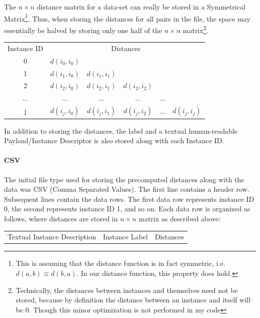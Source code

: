 \documentclass[a4paper,11pt]{report}
\begin{document}
The $n \times n$ distance matrix for a data-set can really be stored in a Symmetrical Matrix\footnote{This is assuming that the distance function is in fact symmetric, i.e. $d(a, b)\equiv d(b, a)$. In our distance function, this property does hold.}. Thus, when storing the distances for all pairs in the file, the space may essentially be halved by storing only one half of the $n \times n$ matrix\footnote{Technically, the distances between instances and themselves need not be stored, because by definition the distance between an instance and itself will be 0. Though this minor optimization is not performed in my code}.

\medskip

\begin{tabular}{ c c c c c c }
	Instance ID & \multicolumn{5}{c}{Distances} \\
	0 & $d(i_{0},i_{0})$ &  &  &  & \\
	1 & $d(i_{1},i_{0})$ & $d(i_{1},i_{1})$ &  &  &  \\
	2 & $d(i_{2},i_{0})$ & $d(i_{2},i_{1})$ & $d(i_{2},i_{2})$ &  & \\ 
	... & ... & ... & ... & ... & \\ 
	j & $d(i_{j},i_{0})$ & $d(i_{j},i_{1})$ & $d(i_{j},i_{2})$ & ... & $d(i_{j},i_{j})$ \\ 
\end{tabular}

\medskip

In addition to storing the distances, the label and a textual human-readable Payload/Instance Descriptor is also stored along with each Instance ID.

\paragraph{CSV}
The initial file type used for storing the precomputed distances along with the data was CSV (Comma Separated Values). The first line contains a header row. Subsequent lines contain the data rows. The first data row represents instance ID 0, the second represents instance ID 1, and so on. Each data row is organized as follows, where distances are stored in $n \times n$ matrix as described above:
\medskip

\begin{tabular}{ |c| |c| |c| }
	Textual Instance Description & Instance Label & Distances \\
\end{tabular}

\medskip
\end{document}
